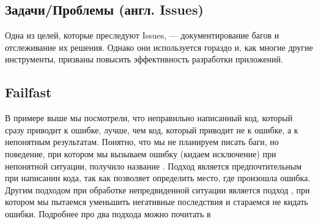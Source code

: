 \documentclass[letterpaper,10pt,russian]{sphinxmanual}
\begin{document}
\begin{sphinxVerbatim}[commandchars=\\\{\}]
 

      

      
          

   
      
\end{sphinxVerbatim}


\subsection{Задачи/Проблемы (англ. Issues)}
\label{\detokenize{educational_materials/terms/content:issues}}
\sphinxAtStartPar
Одна из целей, которые преследуют Issues, — документирование багов и отслеживание их решения. Однако они используется гораздо  и, как многие другие инструменты, призваны повысить эффективность разработки приложений.


\subsection{Fail\sphinxhyphen{}fast}
\label{\detokenize{educational_materials/terms/content:fail-fast}}
\sphinxAtStartPar
В примере выше мы посмотрели, что неправильно написанный код, который сразу приводит к ошибке, лучше, чем код, который приводит не к ошибке, а к непонятным результатам. Понятно, что мы не планируем писать баги, но поведение, при котором мы вызываем ошибку (кидаем исключение) при непонятной ситуации, получило название . Подход  является предпочтительным при написании кода, так как позволяет определить место, где произошла ошибка. Другим подходом при обработке непредвиденной ситуации является подход , при котором мы пытаемся уменьшить негативные последствия и стараемся не кидать ошибки. Подробнее про два подхода можно почитать в 
\end{document}
